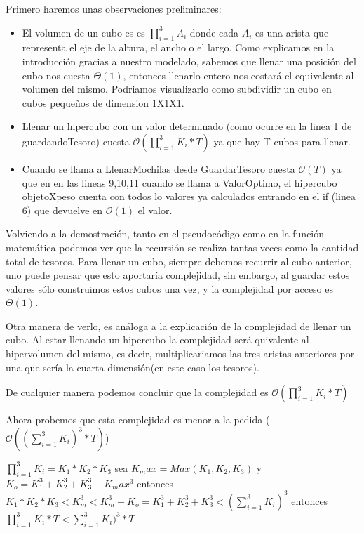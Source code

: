 \documentclass[spanish,12pt]{article}
\begin{document}
Primero haremos unas observaciones preliminares:
\begin{itemize}

	\item El volumen de un cubo es es $\prod_{i=1}^{3}A_{i}$ donde cada $A_i$ es una arista que representa el eje de la altura, el ancho o el largo. Como explicamos en la introducción gracias a nuestro modelado, sabemos que llenar una posición del cubo nos cuesta $\Theta(1)$, entonces llenarlo entero nos costará el equivalente al volumen del mismo. Podriamos visualizarlo como subdividir un cubo en cubos pequeños de dimension 1X1X1.
	\item Llenar un hipercubo con un valor determinado (como ocurre en la linea 1 de guardandoTesoro) cuesta $\mathcal{O}(\prod_{i=1}^{3}K_{i} * T)$ ya que hay T cubos para llenar.
	\item Cuando se llama a LlenarMochilas desde GuardarTesoro cuesta $\mathcal{O}(T)$ ya que en en las lineas 9,10,11 cuando se llama a ValorOptimo, el hipercubo objetoXpeso cuenta con todos lo valores ya calculados entrando en el if (linea 6) que devuelve en $\mathcal{O}(1)$ el valor.
\end{itemize}

Volviendo a la demostración, tanto en el pseudocódigo como en la función matemática podemos ver que la recursión se realiza tantas veces como la cantidad total de tesoros. Para llenar un cubo, siempre debemos recurrir al cubo anterior, uno puede pensar que esto aportaría complejidad, sin embargo, al guardar estos valores sólo construimos estos cubos una vez, y la complejidad por acceso es $\Theta(1)$.

Otra manera de verlo, es análoga a la explicación de la complejidad de llenar un cubo. Al estar llenando un hipercubo la complejidad será quivalente al hipervolumen del mismo, es decir, multiplicariamos las tres aristas anteriores por una que sería la cuarta dimensión(en este caso los tesoros).

De cualquier manera podemos concluir que la complejidad es $\mathcal{O}(\prod_{i=1}^{3}K_{i} * T)$

Ahora probemos que esta complejidad es menor a la pedida ($\mathcal{O}((\sum_{i=1}^{3}K_{i})^{3} * T)$)

$\prod_{i=1}^{3}K_{i}  = K_1*K_2*K_3$   sea $K_max = Max(K_1,K_2,K_3)$ y $K_o= K_1^3 + K_2^3 + K_3^3 - K_max^3$ entonces $K_1*K_2*K_3 < K_m^3 < K_m^3 + K_o = K_1^3+K_2^3+K_3^3 <(\sum_{i=1}^{3}K_{i})^{3}$ entonces $\prod_{i=1}^{3}K_{i}* T < \sum_{i=1}^{3}K_{i})^{3} * T $
\end{document}
